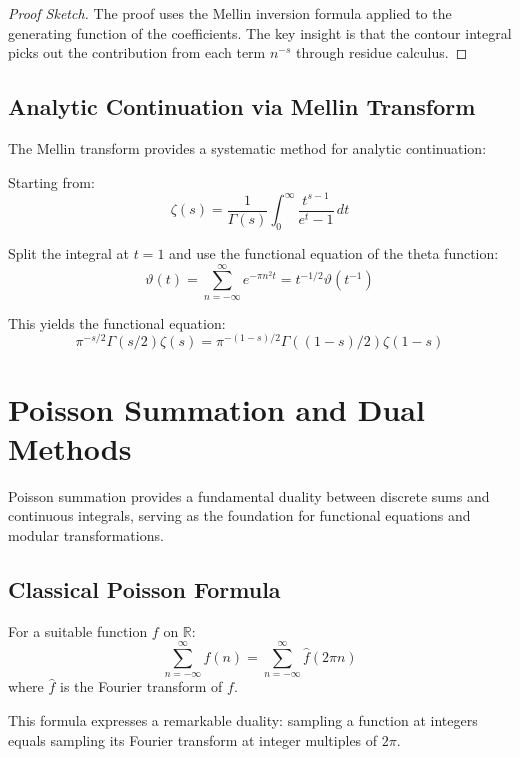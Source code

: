 \begin{proof}[Proof Sketch]
The proof uses the Mellin inversion formula applied to the generating function of the coefficients. The key insight is that the contour integral picks out the contribution from each term $n^{-s}$ through residue calculus.
\end{proof}

\subsection{Analytic Continuation via Mellin Transform}

The Mellin transform provides a systematic method for analytic continuation:

\begin{example}
Starting from:
$$\zeta(s) = \frac{1}{\Gamma(s)} \int_0^{\infty} \frac{t^{s-1}}{e^t - 1} \, dt$$

Split the integral at $t = 1$ and use the functional equation of the theta function:
$$\vartheta(t) = \sum_{n=-\infty}^{\infty} e^{-\pi n^2 t} = t^{-1/2} \vartheta(t^{-1})$$ \cite{titchmarsh1986}

This yields the functional equation:
$$\pi^{-s/2} \Gamma(s/2) \zeta(s) = \pi^{-(1-s)/2} \Gamma((1-s)/2) \zeta(1-s)$$ \cite{riemann1859,titchmarsh1986}
\end{example}

\section{Poisson Summation and Dual Methods}
\label{sec:poisson-summation}

Poisson summation provides a fundamental duality between discrete sums and continuous integrals, serving as the foundation for functional equations and modular transformations.

\subsection{Classical Poisson Formula}

\begin{theorem}
For a suitable function $f$ on $\mathbb{R}$:
$$\sum_{n=-\infty}^{\infty} f(n) = \sum_{n=-\infty}^{\infty} \hat{f}(2\pi n)$$
where $\hat{f}$ is the Fourier transform of $f$.
\end{theorem}

This formula expresses a remarkable duality: sampling a function at integers equals sampling its Fourier transform at integer multiples of $2\pi$.

